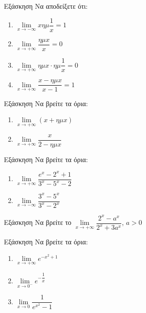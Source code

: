 \documentclass[greek]{beamer}
\begin{document}
\begin{frame}{Εξάσκηση}
      Να αποδείξετε ότι:
      \begin{enumerate}
            \item $\lim\limits_{x \to -\infty}{ xημ\dfrac{1}{x} }=1$ \pause
            \item $\lim\limits_{x \to +\infty}{ \dfrac{ημx}{x}  }=0$  \pause
            \item $\lim\limits_{x \to +\infty}{ ημx\cdot ημ\dfrac{1}{x}  }=0$  \pause
            \item $\lim\limits_{x \to +\infty}{ \dfrac{x-ημx}{x-1}  }=1$
      \end{enumerate}
\end{frame}

\begin{frame}{Εξάσκηση}
      Να βρείτε τα όρια:
      \begin{enumerate}
            \item $\lim\limits_{x \to +\infty}{ (x+ημx) }$ \pause
            \item $\lim\limits_{x \to +\infty}{ \dfrac{x}{2-ημx}  }$
      \end{enumerate}
\end{frame}

\begin{frame}{Εξάσκηση}
      Να βρείτε τα όρια:
      \begin{enumerate}
            \item $\lim\limits_{x \to +\infty}{ \dfrac{e^x-2^x+1}{3^x-5^x-2} }$ \pause
            \item $\lim\limits_{x \to -\infty}{ \dfrac{3^x-5^x}{3^x-2^x}  }$
      \end{enumerate}
\end{frame}

\begin{frame}{Εξάσκηση}
      Να βρείτε το $\lim\limits_{x \to +\infty}{ \dfrac{2^x-a^x}{2^x+3a^x}  }$, $a>0$
\end{frame}

\begin{frame}{Εξάσκηση}
      Να βρείτε τα όρια:
      \begin{enumerate}
            \item $\lim\limits_{x \to +\infty}{ e^{-x^2+1} }$ \pause
            \item $\lim\limits_{x \to 0^-}{ e^{-\dfrac{1}{x}} }$\pause
            \item $\lim\limits_{x \to 0}{ \dfrac{1}{e^{x^2}-1}}$
      \end{enumerate}
\end{frame}
\end{document}
